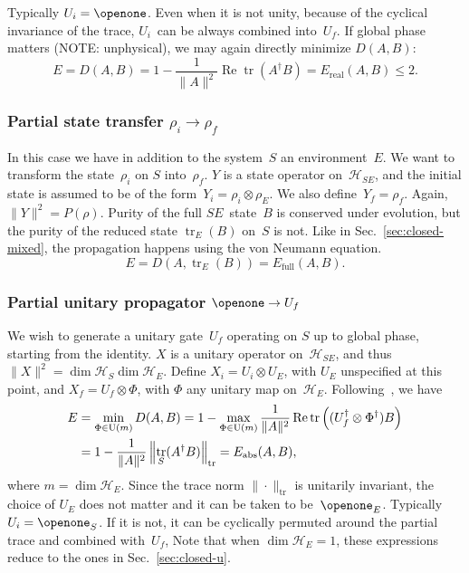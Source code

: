\documentclass[aps, pra, a4paper, longbibliography, superscriptaddress]{revtex4-1}
\newcommand{\I}{\openone}
\newcommand{\be}{\begin{equation}}
\newcommand{\ee}{\end{equation}}
\newcommand{\hilb}[1]{\mathcal{#1}}
\DeclareMathOperator{\tr}{tr}
\DeclareMathOperator{\re}{Re}
\begin{document}
Typically $U_i = \I$.
Even when it is not unity, because of the cyclical invariance of the trace, $U_i$~can be always combined into~$U_f$.
If global phase matters (NOTE: unphysical), we may again directly minimize
$D(A, B)$:
\be
E
= D(A, B)
= 1 -\frac{1}{\|A\|^2} \re \tr(A^\dagger B)
= E_\text{real}(A, B) \le 2.
\ee




\subsubsection{Partial state transfer $\rho_i \to \rho_f$}

In this case we have in addition to the system~$S$ an environment~$E$.
We want to transform the state~$\rho_i$ on $S$ into~$\rho_f$.
$Y$ is a state operator on~$\hilb{H}_{SE}$, and
the initial state is assumed to be of the
form~$Y_i = \rho_i \otimes \rho_E$.
We also define~$Y_f = \rho_f$.
Again, $\|Y\|^2 = P(\rho)$.
Purity of the full $SE$~state~$B$ is conserved under evolution,
but the purity of the reduced state $\tr_E(B)$ on~$S$ is not.
Like in Sec.~\ref{sec:closed-mixed},
the propagation happens using the von Neumann equation.
\be
E
= D(A, \tr_E(B))
= E_\text{full}(A, B).
\ee


\subsubsection{Partial unitary propagator $\I \to U_f$}
\label{sec:partU}

We wish to generate a unitary gate~$U_f$ operating on $S$ up to global
phase, starting from the identity.
$X$ is a unitary operator on~$\hilb{H}_{SE}$, and
thus $\|X\|^2 = \dim \hilb{H}_S \dim \hilb{H}_E$.
Define $X_i = U_i \otimes U_E$, with $U_E$ unspecified at this point,
and $X_f = U_f \otimes \Phi$, with $\Phi$ any unitary map on~$\hilb{H}_E$.
Following~\cite{kosut_2006,floether_2012}, we have
\begin{align}
\notag
E
&= \min_{\Phi \in \text{U}(m)} D(A, B)
= 1 -\max_{\Phi \in \text{U}(m)} \frac{1}{\|A\|^2} \re \tr\left((U_f^\dagger \otimes \Phi^\dagger) B\right)\\
&= 1 -\frac{1}{\|A\|^2} \left\|\tr_S(A^\dagger B)\right\|_{\tr}
= E_\text{abs}(A, B),
\end{align}
where $m = \dim \hilb{H}_E$.
Since the trace norm $\|\cdot\|_{\tr}$ is unitarily invariant, the
choice of $U_E$ does not matter and it can be taken to be~$\I_E$.
Typically $U_i = \I_S$. If it is not, it can be cyclically permuted around the partial trace and combined with~$U_f$,
Note that when $\dim \hilb{H}_E = 1$, these expressions reduce to the ones in Sec.~\ref{sec:closed-u}.
\end{document}
